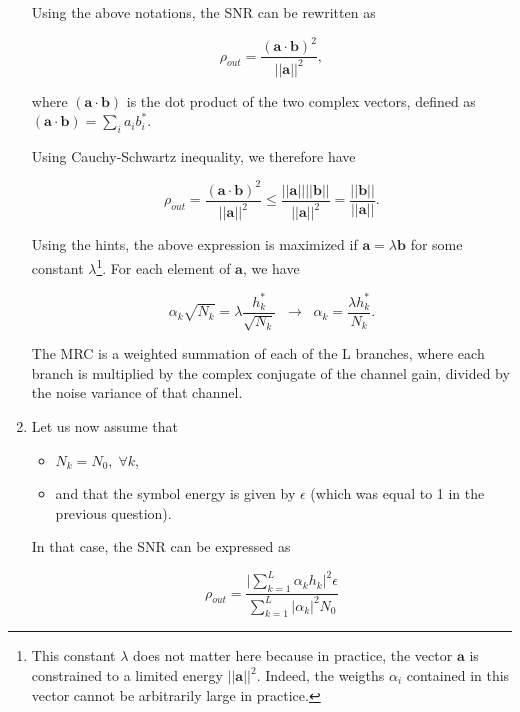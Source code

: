 \documentclass [a4paper, 11pt] {article}
\begin{document}
\begin{solution}
\begin{enumerate}
    Using the above notations, the SNR can be rewritten as

        \begin{equation}
        \rho_{out} = \dfrac{(\mathbf{a} \cdot\mathbf{b})^2 }{||\mathbf{a}||^2},
        \end{equation}

    where $(\mathbf{a} \cdot\mathbf{b})$ is the dot product of the two complex vectors, defined as $(\mathbf{a} \cdot\mathbf{b}) = \sum_i a_i b_i^*$.

    Using Cauchy-Schwartz inequality, we therefore have

        \begin{equation}
        \rho_{out} = \dfrac{(\mathbf{a} \cdot\mathbf{b})^2 }{||\mathbf{a}||^2} \leq \dfrac{||\mathbf{a}|| ||\mathbf{b}|| }{||\mathbf{a}||^2} = \dfrac{ ||\mathbf{b}|| }{||\mathbf{a}||}.
        \end{equation}

    Using the hints, the above expression is maximized if $\mathbf{a} = \lambda  \mathbf{b} $ for some constant $\lambda$\footnote{ This constant $\lambda$ does not matter here because in practice, the vector $\mathbf{a}$ is constrained to a limited energy $||\mathbf{a}||^2$. Indeed, the weigths $\alpha_i$ contained in this vector cannot be arbitrarily large in practice.}. For each element of $\mathbf{a}$, we have

    \begin{equation}
        \alpha_k\sqrt{N_k} = \lambda \frac{h^*_k}{\sqrt{N_k}} \; \; \rightarrow \; \; \alpha_k = \frac{\lambda h_k^*}{N_k}.
    \end{equation}

    The MRC is a weighted summation of each of the L branches, where each branch is multiplied by the complex conjugate of the channel gain, divided by the noise variance of that channel.

    \item Let us now assume that

    \begin{itemize}
        \item $N_k = N_0, \; \forall k$,
        \item and that the symbol energy is given by $\epsilon$ (which was equal to 1 in the previous question).
    \end{itemize}

    In that case, the SNR can be expressed as

    \begin{equation}
        \rho_{out} = \dfrac{\Big| \sum_{k=1}^{L}\alpha_kh_k \Big|^2 \epsilon}{\sum_{k=1}^{L} |\alpha_k|^2N_0}
    \end{equation}


\end{enumerate}
\end{solution}
\end{document}
